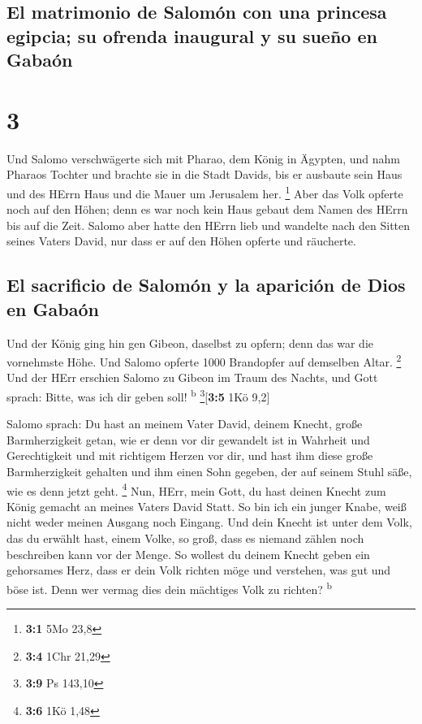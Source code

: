 \hypertarget{el-matrimonio-de-salomuxf3n-con-una-princesa-egipcia-su-ofrenda-inaugural-y-su-sueuxf1o-en-gabauxf3n}{%
\subsection{El matrimonio de Salomón con una princesa egipcia; su
ofrenda inaugural y su sueño en
Gabaón}\label{el-matrimonio-de-salomuxf3n-con-una-princesa-egipcia-su-ofrenda-inaugural-y-su-sueuxf1o-en-gabauxf3n}}

\hypertarget{section-2}{%
\section{3}\label{section-2}}

 Und Salomo verschwägerte sich mit Pharao, dem König in
Ägypten, und nahm Pharaos Tochter und brachte sie in die Stadt Davids,
bis er ausbaute sein Haus und des HErrn Haus und die Mauer um Jerusalem
her. \footnote{\textbf{3:1} 5Mo 23,8}  Aber das Volk
opferte noch auf den Höhen; denn es war noch kein Haus gebaut dem Namen
des HErrn bis auf die Zeit.  Salomo aber hatte den HErrn
lieb und wandelte nach den Sitten seines Vaters David, nur dass er auf
den Höhen opferte und räucherte.

\hypertarget{el-sacrificio-de-salomuxf3n-y-la-apariciuxf3n-de-dios-en-gabauxf3n}{%
\subsection{El sacrificio de Salomón y la aparición de Dios en
Gabaón}\label{el-sacrificio-de-salomuxf3n-y-la-apariciuxf3n-de-dios-en-gabauxf3n}}

 Und der König ging hin gen Gibeon, daselbst zu opfern;
denn das war die vornehmste Höhe. Und Salomo opferte 1000 Brandopfer auf
demselben Altar. \footnote{\textbf{3:4} 1Chr 21,29}  Und
der HErr erschien Salomo zu Gibeon im Traum des Nachts, und Gott sprach:
Bitte, was ich dir geben soll! \textsuperscript{b}
\footnote{\textbf{3:9} Ps 143,10}{[}\textbf{3:5} 1Kö 9,2{]}

 Salomo sprach: Du hast an meinem Vater David, deinem
Knecht, große Barmherzigkeit getan, wie er denn vor dir gewandelt ist in
Wahrheit und Gerechtigkeit und mit richtigem Herzen vor dir, und hast
ihm diese große Barmherzigkeit gehalten und ihm einen Sohn gegeben, der
auf seinem Stuhl säße, wie es denn jetzt geht. \footnote{\textbf{3:6}
  1Kö 1,48}  Nun, HErr, mein Gott, du hast deinen Knecht
zum König gemacht an meines Vaters David Statt. So bin ich ein junger
Knabe, weiß nicht weder meinen Ausgang noch Eingang.  Und
dein Knecht ist unter dem Volk, das du erwählt hast, einem Volke, so
groß, dass es niemand zählen noch beschreiben kann vor der Menge.
 So wollest du deinem Knecht geben ein gehorsames Herz,
dass er dein Volk richten möge und verstehen, was gut und böse ist. Denn
wer vermag dies dein mächtiges Volk zu richten? \textsuperscript{b}

